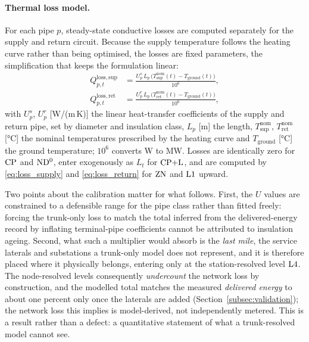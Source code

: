\paragraph{Thermal loss model.}
For each pipe $p$, steady-state conductive losses are computed separately for the supply
and return circuit. Because the supply temperature follows the heating curve rather than
being optimised, the losses are fixed parameters, the simplification that keeps the
formulation linear:
\begin{align}
  Q_{p,t}^{\mathrm{loss,sup}} &= \frac{U^{s}_p\, L_p\,
    \bigl(T_{\mathrm{sup}}^{\mathrm{nom}}(t)
    - T_{\mathrm{ground}}(t)\bigr)}{10^6},
  \label{eq:loss_supply} \\[4pt]
  Q_{p,t}^{\mathrm{loss,ret}} &= \frac{U^{r}_p\, L_p\,
    \bigl(T_{\mathrm{ret}}^{\mathrm{nom}}(t)
    - T_{\mathrm{ground}}(t)\bigr)}{10^6},
  \label{eq:loss_return}
\end{align}
with $U^{s}_p$, $U^{r}_p$ [W/(m\,K)] the linear heat-transfer coefficients of the supply
and return pipe, set by diameter and insulation class, $L_p$ [m] the length,
$T_{\mathrm{sup}}^{\mathrm{nom}}$, $T_{\mathrm{ret}}^{\mathrm{nom}}$ [°C] the nominal
temperatures prescribed by the heating curve and $T_{\mathrm{ground}}$ [°C] the ground
temperature; $10^6$ converts W to MW. Losses are identically zero for $\mathrm{CP}$ and $\mathrm{ND^{0}}$,
enter exogenously as $L_t$ for $\mathrm{CP{+}L}$, and are computed by \eqref{eq:loss_supply} and
\eqref{eq:loss_return} for $\mathrm{ZN}$ and $\mathrm{L1}$ upward.

Two points about the calibration matter for what follows. First, the $U$ values are
constrained to a defensible range for the pipe class rather than fitted freely: forcing the
trunk-only loss to match the total inferred from the delivered-energy record by inflating
terminal-pipe coefficients cannot be attributed to insulation ageing. Second, what such a multiplier would absorb is the
\emph{last mile}, the service laterals and substations a trunk-only model does not represent,
and it is therefore placed where it physically belongs, entering only at the station-resolved
level $\mathrm{L4}$. The node-resolved levels consequently \emph{undercount} the network
loss by construction, and the modelled total matches the measured \emph{delivered energy} to
about one percent only once the laterals are added (Section~\ref{subsec:validation}); the
network loss this implies is model-derived, not independently metered. This is a result rather
than a defect: a quantitative statement of what a trunk-resolved model cannot see.

